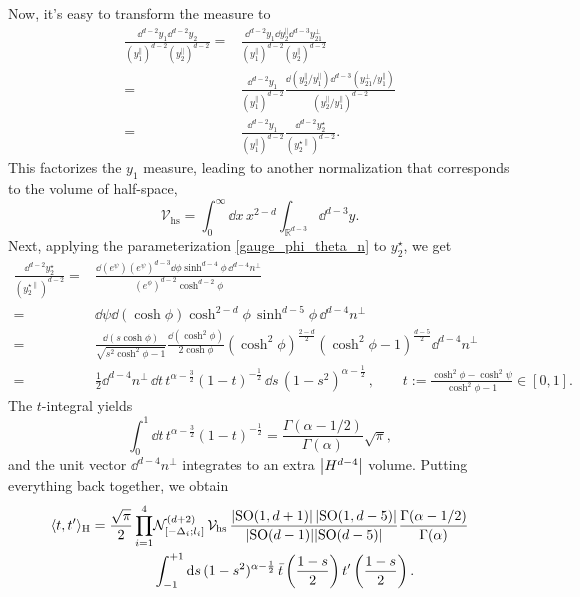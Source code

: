 \documentclass{article}
\def \Dg {\Delta}
\def \ag {\alpha}
\def \Rs {\mathbb{R}}
\begin{document}
Now, it's easy to transform the measure to 
\begin{align*}
    \frac{\dd^{d-2} y_1 \dd^{d-2} y_2}{(y_1^{\parallel})^{d-2} (y_2^{\parallel})^{d-2}} =& \frac{\dd^{d-2} y_1 \dd y_2^{\parallel} \dd^{d-3} y_{21}^{\perp}}{(y_1^{\parallel})^{d-2} (y_2^{\parallel})^{d-2}} \\
    =& \frac{\dd^{d-2} y_1}{(y_1^{\parallel})^{d-2}} \frac{ \dd( y_2^{\parallel}/y_1^{\parallel}) \dd^{d-3} (y_{21}^{\perp}/y_1^{\parallel})}{ (y_2^{\parallel}/y_1^{\parallel})^{d-2}} \\
    =& \frac{\dd^{d-2} y_1}{(y_1^{\parallel})^{d-2}} \frac{\dd^{d-2} y_2^{\star}}{(y_2^{\star \parallel})^{d-2}}.
\end{align*}
This factorizes the $y_1$ measure, leading to another normalization that corresponds to the volume of half-space,
\begin{equation*}
    \mathcal{V}_{\mathrm{hs}} = \int_0^{\infty} \dd x \, x^{2-d} \int_{\Rs^{d-3}} \dd^{d-3} y.
\end{equation*}
Next, applying the parameterization \eqref{gauge_phi_theta_n} to $y_2^{\star}$, we get
\begin{align*}
   \frac{\dd^{d-2} y_2^{\star}}{(y_2^{\star \parallel})^{d-2}} =& \frac{\dd(e^{\psi}) (e^{\psi})^{d-3} \dd\phi \sinh^{d-4}\phi \, \dd^{d-4} n^{\perp}}{(e^{\phi})^{d-2} \cosh^{d-2} \phi} \\
   =&  \dd \psi  \dd(\cosh\phi)\cosh^{2-d}\phi\,\sinh^{d-5}\phi\, \dd^{d-4}n^{\perp} \\
   =& \frac{\dd(s \cosh \phi)}{\sqrt{s^2\cosh^2\phi-1}} \frac{\dd(\cosh^2\phi)}{2 \cosh\phi} (\cosh^2\phi)^{\frac{2-d}{2}} (\cosh^2\phi-1)^{\frac{d-5}{2}} \dd^{d-4}n^{\perp} \\
   =& \frac{1}{2} \dd^{d-4} n^{\perp} \, \dd t\, t^{\ag-\frac{3}{2}} (1-t)^{-\frac{1}{2}} \, \dd s \, (1-s^2)^{\ag-\frac{1}{2}}\,, \qquad t:= \frac{\cosh^2 \phi - \cosh^2\psi}{\cosh^2\phi-1} \in [0,1].
\end{align*}
The $t$-integral yields
\begin{equation}
    \int_0^1 \dd t\, t^{\ag-\frac{3}{2}} (1-t)^{-\frac{1}{2}} =  \frac{\Gamma(\ag-1/2)}{\Gamma(\ag)} \sqrt{\pi},  
\end{equation}
and the unit vector $\dd^{d-4} n^{\perp}$ integrates to an extra $\abs{H^{d-4}}$ volume. Putting everything back together, we obtain 
\begin{align}
    \langle t, t' \rangle_{\mathrm{H}} = \frac{ \sqrt{\pi}}{2}  \prod_{i=1}^4 &\mathcal{N}_{[-\Dg_i;l_i]}^{(d+2)} \,  \mathcal{V}_{\mathrm{hs}} \, \frac{\abs{\mathrm{SO}(1,d+1)} \, \abs{\mathrm{SO}(1,d-5)}}{\abs{\mathrm{SO}(d-1)} \abs{\mathrm{SO}(d-5)}} \frac{\Gamma(\ag-1/2)}{\Gamma(\ag)} \nonumber \\
    & \int_{-1}^{+1} \dd s \, (1-s^2)^{\ag-\frac{1}{2}}\, \bar{t}\left( \frac{1-s}{2}\right) t'\left(\frac{1-s}{2}\right). 
\end{align}
\end{document}
